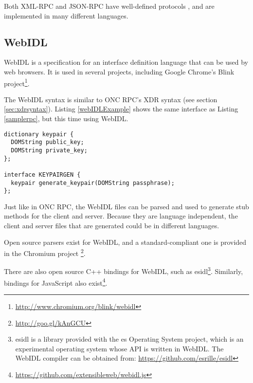 Both XML-RPC and JSON-RPC have well-defined protocols \cite{jsonrpcspec}\cite{xmlrpcspec}, and are implemented in many different languages.

\subsection{WebIDL} %
\label{sub:webidl_intro}
WebIDL is a specification \cite{webidlw3c} for an interface definition language that can be used by web browsers. It is used in several projects, including Google Chrome's Blink project\footnote{\url{http://www.chromium.org/blink/webidl}}.

The WebIDL syntax is similar to ONC RPC's XDR syntax (see section \ref{sec:xdrsyntax}). Listing \ref{webIDLExample} shows the same interface as Listing \ref{samplerpc}, but this time using WebIDL.

\begin{lstlisting}
dictionary keypair {
  DOMString public_key;
  DOMString private_key;
};

interface KEYPAIRGEN {
  keypair generate_keypair(DOMString passphrase);
};
\end{lstlisting}

Just like in ONC RPC, the WebIDL files can be parsed and used to generate stub methods for the client and server. Because they are language independent, the client and server files that are generated could be in different languages. 

Open source parsers exist for WebIDL, and a standard-compliant one is provided in the Chromium project
\footnote{ \url{http://goo.gl/kAnGCU} }. 

There are also open source C++ bindings for WebIDL, such as esidl\footnote{esidl is a library provided with the es Operating System project, which is an experimental operating system whose API is written in WebIDL. The WebIDL compiler can be obtained from: \url{https://github.com/esrille/esidl}}. Similarly, bindings for JavaScript also exist\footnote{\url{https://github.com/extensibleweb/webidl.js}}. 


